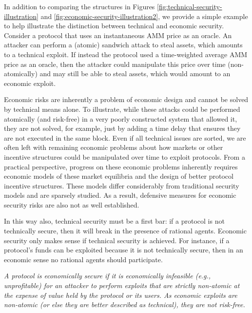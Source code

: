 In addition to comparing the structures in Figures \ref{fig:technical-security-illustration} and \ref{fig:economic-security-illustration2}, we provide a simple example to help illustrate the distinction between technical and economic security. Consider a protocol that uses an instantaneous AMM price as an oracle. An attacker can perform a (atomic) sandwich attack to steal assets, which amounts to a technical exploit. If instead the protocol used a time-weighted average AMM price as an oracle, then the attacker could manipulate this price over time (non-atomically) and may still be able to steal assets, which would amount to an economic exploit.

Economic risks are inherently a problem of economic design and cannot be solved by technical means alone. To illustrate, while these attacks could be performed atomically (and risk-free) in a very poorly constructed system that allowed it, they are not solved, for example, just by adding a time delay that ensures they are not executed in the same block. Even if all technical issues are sorted, we are often left with remaining economic problems about how markets or other incentive structures could be manipulated over time to exploit protocols.
From a practical perspective, progress on these economic problems inherently requires economic models of these market equilibria and the design of better protocol incentive structures. These models differ considerably from traditional security models and are sparsely studied. As a result, defensive measures for economic security risks are also not as well established.

In this way also, technical security must be a first bar: if a protocol is not technically secure, then it will break in the presence of rational agents. Economic security only makes sense if technical security is achieved. For instance, if a protocol's funds can be exploited because it is not technically secure, then in an economic sense no rational agents should participate.


\begin{tcolorbox}[boxsep=1pt,left=2pt,right=2pt,top=2pt,bottom=2pt, title=Economic Security]
\emph{A protocol is economically secure if it is economically infeasible (e.g., unprofitable) for an attacker to perform exploits that are strictly non-atomic at the expense of value held by the protocol or its users. As economic exploits are non-atomic (or else they are better described as technical), they are not risk-free.}
\end{tcolorbox}
